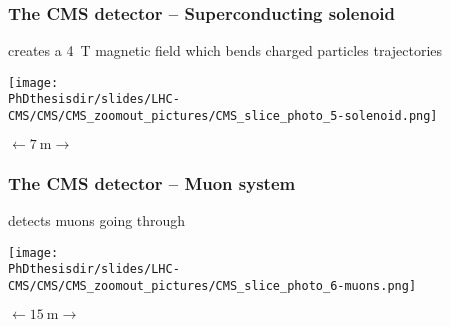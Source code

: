 \begin{frame}\addtocounter{framenumber}{-1}
\frametitle{The CMS detector -- Superconducting solenoid}
\begin{center}
creates a \SI{4}{\tesla} magnetic field which bends charged particles trajectories

\vfill

\texttt{[image: \\PhDthesisdir/slides/LHC-CMS/CMS/CMS\_zoomout\_pictures/CMS\_slice\_photo\_5-solenoid.png]}

\vfill

$\longleftarrow \SI{7}{\meter} \longrightarrow$
\end{center}
\end{frame}
\begin{frame}\addtocounter{framenumber}{-1}
\frametitle{The CMS detector -- Muon system}
\begin{center}
detects muons going through

\vfill

\texttt{[image: \\PhDthesisdir/slides/LHC-CMS/CMS/CMS\_zoomout\_pictures/CMS\_slice\_photo\_6-muons.png]}

\vfill

$\longleftarrow \SI{15}{\meter} \longrightarrow$
\end{center}
\end{frame}